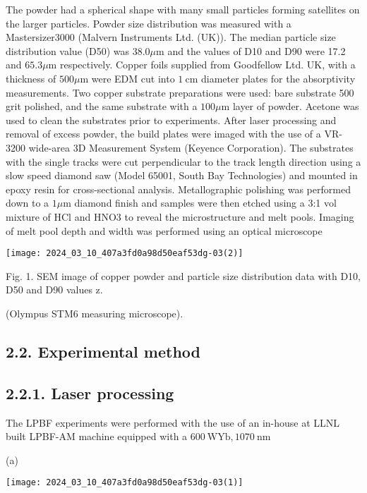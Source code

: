 \documentclass[10pt]{article}
\begin{document}
The powder had a spherical shape with many small particles forming satellites on the larger particles. Powder size distribution was measured with a Mastersizer3000 (Malvern Instruments Ltd. (UK)). The median particle size distribution value (D50) was $38.0 \mu \mathrm{m}$ and the values of D10 and D90 were 17.2 and $65.3 \mu \mathrm{m}$ respectively. Copper foils supplied from Goodfellow Ltd. UK, with a thickness of $500 \mu \mathrm{m}$ were EDM cut into $1 \mathrm{~cm}$ diameter plates for the absorptivity measurements. Two copper substrate preparations were used: bare substrate 500 grit polished, and the same substrate with a $100 \mu \mathrm{m}$ layer of powder. Acetone was used to clean the substrates prior to experiments. After laser processing and removal of excess powder, the build plates were imaged with the use of a VR-3200 wide-area 3D Measurement System (Keyence Corporation). The substrates with the single tracks were cut perpendicular to the track length direction using a slow speed diamond saw (Model 65001, South Bay Technologies) and mounted in epoxy resin for cross-sectional analysis. Metallographic polishing was performed down to a $1 \mu \mathrm{m}$ diamond finish and samples were then etched using a 3:1 vol mixture of $\mathrm{HCl}$ and HNO3 to reveal the microstructure and melt pools. Imaging of melt pool depth and width was performed using an optical microscope

\begin{center}
\texttt{[image: 2024\_03\_10\_407a3fd0a98d50eaf53dg-03(2)]}
\end{center}

Fig. 1. SEM image of copper powder and particle size distribution data with D10, D50 and D90 values z.

(Olympus STM6 measuring microscope).

\subsection*{2.2. Experimental method}
\subsection*{2.2.1. Laser processing}
The LPBF experiments were performed with the use of an in-house at LLNL built LPBF-AM machine equipped with a $600 \mathrm{~W} \mathrm{Yb}, 1070 \mathrm{~nm}$

(a)

\begin{center}
\texttt{[image: 2024\_03\_10\_407a3fd0a98d50eaf53dg-03(1)]}
\end{center}
\end{document}
